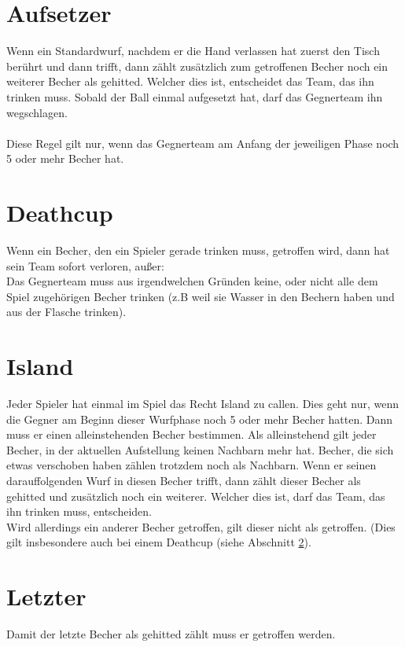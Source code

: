 \documentclass[a5paper, 12pt]{book}
\begin{document}
\section{Aufsetzer}\label{aufsetzer}
Wenn ein Standardwurf, nachdem er die Hand verlassen hat zuerst den Tisch berührt und dann trifft, dann zählt zusätzlich zum getroffenen Becher noch ein weiterer Becher als gehitted. Welcher dies ist, entscheidet das Team, das ihn trinken muss. Sobald der Ball einmal aufgesetzt hat, darf das Gegnerteam ihn wegschlagen.\\\\
Diese Regel gilt nur, wenn das Gegnerteam am Anfang der jeweiligen Phase noch 5 oder mehr Becher hat.

\section{Deathcup}\label{deathcup}
Wenn ein Becher, den ein Spieler gerade trinken muss, getroffen wird, dann hat sein Team sofort verloren, außer:\\
Das Gegnerteam muss aus irgendwelchen Gründen keine, oder nicht alle dem Spiel zugehörigen Becher trinken (z.B weil sie Wasser in den Bechern haben und aus der Flasche trinken).
\section{Island}\label{island}
Jeder Spieler hat einmal im Spiel das Recht Island zu callen. Dies geht nur, wenn die Gegner am Beginn dieser Wurfphase noch 5 oder mehr Becher hatten. Dann muss er einen alleinstehenden Becher bestimmen. Als alleinstehend gilt jeder Becher, in der aktuellen Aufstellung keinen Nachbarn mehr hat. Becher, die sich etwas verschoben haben zählen trotzdem noch als Nachbarn. Wenn er seinen darauffolgenden Wurf in diesen Becher trifft, dann zählt dieser Becher als gehitted und zusätzlich noch ein weiterer. Welcher dies ist, darf das Team, das ihn trinken muss, entscheiden.\\
Wird allerdings ein anderer Becher getroffen, gilt dieser nicht als getroffen. (Dies gilt insbesondere auch bei einem Deathcup (siehe Abschnitt \ref{deathcup}).
\section{Letzter}\label{letzter}
Damit der letzte Becher als gehitted zählt muss er getroffen werden. 
\end{document}
